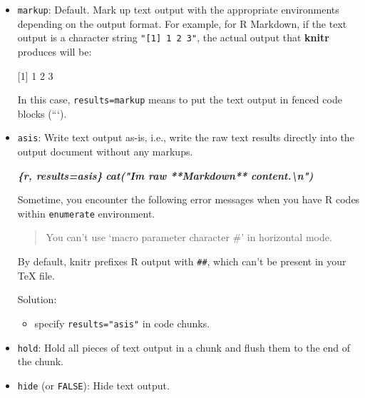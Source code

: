 \documentclass[
]{book}
\newenvironment{Shaded}{\begin{snugshade}}{\end{snugshade}}
\newcommand{\AttributeTok}[1]{\textcolor[rgb]{0.13,0.29,0.53}{#1}}
\newcommand{\InformationTok}[1]{\textcolor[rgb]{0.56,0.35,0.01}{\textbf{\textit{#1}}}}
\newcommand{\StringTok}[1]{\textcolor[rgb]{0.31,0.60,0.02}{#1}}
\providecommand{\tightlist}{%
  \setlength{\itemsep}{0pt}\setlength{\parskip}{0pt}}
\begin{document}
\begin{itemize}
\item
  \texttt{markup}: Default. Mark up text output with the appropriate environments depending on the output format. For example, for R Markdown, if the text output is a character string \texttt{"{[}1{]}\ 1\ 2\ 3"}, the actual output that \textbf{knitr} produces will be:

\begin{Shaded}
\begin{Highlighting}[]
\StringTok{\textasciigrave{}\textasciigrave{}\textasciigrave{}}
\AttributeTok{[1] 1 2 3}
\StringTok{\textasciigrave{}\textasciigrave{}\textasciigrave{}}
\end{Highlighting}
\end{Shaded}

  In this case, \texttt{results=\textquotesingle{}markup\textquotesingle{}} means to put the text output in fenced code blocks (```).
\item
  \texttt{asis}: Write text output as-is, i.e., write the raw text results directly into the output document without any markups.

\begin{Shaded}
\begin{Highlighting}[]
\InformationTok{\textasciigrave{}\textasciigrave{}\textasciigrave{}\{r, results=\textquotesingle{}asis\textquotesingle{}\}}
\InformationTok{cat("I\textquotesingle{}m raw **Markdown** content.\textbackslash{}n")}
\InformationTok{\textasciigrave{}\textasciigrave{}\textasciigrave{}}
\end{Highlighting}
\end{Shaded}

  Sometime, you encounter the following error messages when you have R codes within \texttt{enumerate} environment.

  \begin{quote}
  You can't use `macro parameter character \#' in horizontal mode.
  \end{quote}

  By default, knitr prefixes R output with \texttt{\#\#}, which can't be present in your TeX file.

  Solution:

  \begin{itemize}
  \tightlist
  \item
    specify \texttt{results="asis"} in code chunks.
  \end{itemize}
\item
  \texttt{hold}: Hold all pieces of text output in a chunk and flush them to the end of the chunk.
\item
  \texttt{hide} (or \texttt{FALSE}): Hide text output.
\end{itemize}
\end{document}
